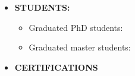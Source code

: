 \documentclass[10pt]{article}
\begin{document}
\begin{itemize}
\begin{itemize}
	\item \textbf{Conferences}:
	
	
	\item \textbf{Preprints}:
	
\end{itemize}

\vspace{0.5cm}
\item{\bf STUDENTS:}

\begin{itemize}
    \item Graduated PhD students:
	
	
	\item Graduated master students:
	
\end{itemize}

\vspace{0.5cm}
\item \textbf{CERTIFICATIONS}


\end{itemize}
\end{document}
